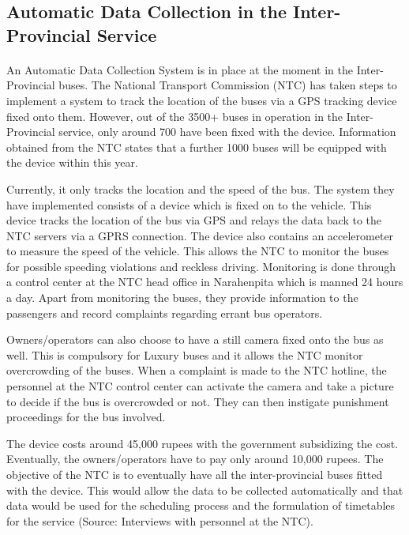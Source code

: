 \subsection{Automatic Data Collection in the Inter-Provincial Service} 

\paragraph{ } An Automatic Data Collection System is in place at the moment in the Inter-Provincial buses. The National Transport Commission (NTC) has taken steps to implement a system to track the location of the buses via a GPS tracking device fixed onto them. However, out of the 3500+ buses in operation in the Inter-Provincial service, only around 700 have been fixed with the device. Information obtained from the NTC states that a further 1000 buses will be equipped with the device within this year.

Currently, it only tracks the location and the speed of the bus. The system they have implemented consists of a device which is fixed on to the vehicle. This device tracks the location of the bus via GPS and relays the data back to the NTC servers via a GPRS connection. The device also contains an accelerometer to measure the speed of the vehicle. This allows the NTC to monitor the buses for possible speeding violations and reckless driving. Monitoring is done through a control center at the NTC head office in Narahenpita which is manned 24 hours a day. Apart from monitoring the buses, they provide information to the passengers and record complaints regarding errant bus operators.

Owners/operators can also choose to have a still camera fixed onto the bus as well. This is compulsory for Luxury buses and it allows the NTC monitor overcrowding of the buses. When a complaint is made to the NTC hotline, the personnel at the NTC control center can activate the camera and take a picture to decide if the bus is overcrowded or not. They can then instigate punishment proceedings for the bus involved.

The device costs around 45,000 rupees with the government subsidizing the cost. Eventually, the owners/operators have to pay only around 10,000 rupees. The objective of the NTC is to eventually have all the inter-provincial buses fitted with the device. This would allow the data to be collected automatically and that data would be used for the scheduling process and the formulation of timetables for the service (Source: Interviews with personnel at the NTC).


